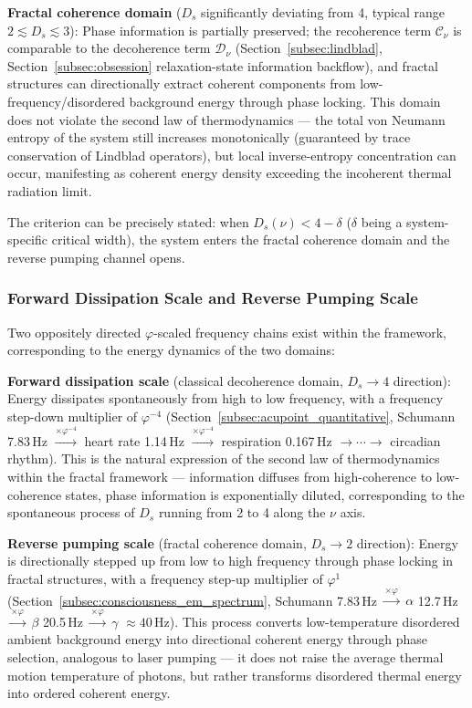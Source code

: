 \documentclass[12pt,a4paper,twocolumn]{article}
\renewcommand{\phi}{\varphi}
\begin{document}
\textbf{Fractal coherence domain} ($D_s$ significantly deviating from 4, typical range $2 \lesssim D_s \lesssim 3$): Phase information is partially preserved; the recoherence term $\mathcal{C}_\nu$ is comparable to the decoherence term $\mathcal{D}_\nu$ (Section~\ref{subsec:lindblad}, Section~\ref{subsec:obsession} relaxation-state information backflow), and fractal structures can directionally extract coherent components from low-frequency/disordered background energy through phase locking. This domain does not violate the second law of thermodynamics --- the total von Neumann entropy of the system still increases monotonically (guaranteed by trace conservation of Lindblad operators), but local inverse-entropy concentration can occur, manifesting as coherent energy density exceeding the incoherent thermal radiation limit.

The criterion can be precisely stated: when $D_s(\nu) < 4 - \delta$ ($\delta$ being a system-specific critical width), the system enters the fractal coherence domain and the reverse pumping channel opens.

\subsubsection{Forward Dissipation Scale and Reverse Pumping Scale}

Two oppositely directed $\phi$-scaled frequency chains exist within the framework, corresponding to the energy dynamics of the two domains:

\textbf{Forward dissipation scale} (classical decoherence domain, $D_s\to 4$ direction): Energy dissipates spontaneously from high to low frequency, with a frequency step-down multiplier of $\phi^{-4}$ (Section~\ref{subsec:acupoint_quantitative}, Schumann 7.83\,Hz $\xrightarrow{\times\phi^{-4}}$ heart rate 1.14\,Hz $\xrightarrow{\times\phi^{-4}}$ respiration 0.167\,Hz $\to \cdots \to$ circadian rhythm). This is the natural expression of the second law of thermodynamics within the fractal framework --- information diffuses from high-coherence to low-coherence states, phase information is exponentially diluted, corresponding to the spontaneous process of $D_s$ running from 2 to 4 along the $\nu$ axis.

\textbf{Reverse pumping scale} (fractal coherence domain, $D_s\to 2$ direction): Energy is directionally stepped up from low to high frequency through phase locking in fractal structures, with a frequency step-up multiplier of $\phi^{1}$ (Section~\ref{subsec:consciousness_em_spectrum}, Schumann 7.83\,Hz $\xrightarrow{\times\phi}$ $\alpha$ 12.7\,Hz $\xrightarrow{\times\phi}$ $\beta$ 20.5\,Hz $\xrightarrow{\times\phi}$ $\gamma$ $\approx 40$\,Hz). This process converts low-temperature disordered ambient background energy into directional coherent energy through phase selection, analogous to laser pumping --- it does not raise the average thermal motion temperature of photons, but rather transforms disordered thermal energy into ordered coherent energy.
\end{document}
